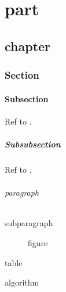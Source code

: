 \documentclass[english]{book}
\theoremstyle{plain}
\theoremstyle{plain}
\theoremstyle{plain}
\theoremstyle{plain}
\theoremstyle{plain}
\theoremstyle{plain}
\theoremstyle{definition}
\theoremstyle{definition}
\theoremstyle{definition}
\theoremstyle{definition}
\theoremstyle{remark}
\theoremstyle{remark}
\begin{document}
\part{part\label{part:part}}



\chapter{chapter\label{chap:chapter}}



\section{Section\label{sec:Section}}



\subsection{Subsection\label{sub:subsection}}

Ref to .


\subsubsection{Subsubsection\label{sub:Subsubsection}}

Ref to .


\paragraph{paragraph\label{par:paragraph}}



\subparagraph{subparagraph\label{par:subparagraph}}


\begin{figure}
\protect\caption{figure\label{fig:figure}}
\end{figure}



\begin{table}
\protect\caption{table\label{tab:table}}
\end{table}



\begin{algorithm}
\protect\caption{algorithm\label{alg:algorithm}}
\end{algorithm}
\end{document}
